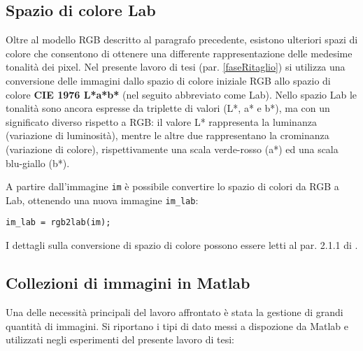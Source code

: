 \subsection{Spazio di colore Lab}
Oltre al modello RGB descritto al paragrafo precedente, esistono ulteriori spazi di colore che consentono di ottenere una differente rappresentazione delle medesime tonalità dei pixel.
Nel presente lavoro di tesi (par. \ref{faseRitaglio}) si utilizza una conversione delle immagini dallo spazio di colore iniziale RGB allo spazio di colore \textbf{CIE 1976 L*a*b*} (nel seguito abbreviato come Lab).
Nello spazio Lab le tonalità sono ancora espresse da triplette di valori (L*, a* e b*), ma con un significato diverso rispetto a RGB: il valore L* rappresenta la luminanza
(variazione di luminosità), mentre le altre due rappresentano la crominanza (variazione
di colore), rispettivamente una scala verde-rosso (a*) ed una scala blu-giallo (b*).

A partire dall’immagine \verb|im| è possibile convertire lo spazio di colori da RGB a Lab, ottenendo una nuova immagine \verb|im_lab|:
\begin{verbatim}
im_lab = rgb2lab(im);
\end{verbatim}
I dettagli sulla conversione di spazio di colore possono essere letti al par. 2.1.1 di \cite{gianvito}.

\subsection{Collezioni di immagini in Matlab}
\label{datastore}
Una delle necessità principali del lavoro affrontato è stata la gestione di grandi quantità di immagini. Si riportano i tipi di dato messi a dispozione da Matlab e utilizzati negli esperimenti del presente lavoro di tesi:

